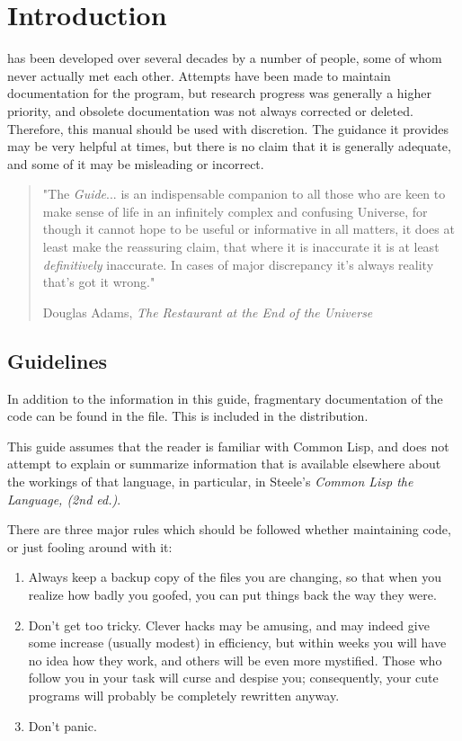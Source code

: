 \chapter{Introduction}

\TPS has been developed over several decades by a number of people,
some of whom never actually met each other. Attempts have been made
to maintain documentation for the program, but research progress was 
generally a higher priority, and obsolete documentation was not always
corrected or deleted. Therefore, this manual should be used with discretion.
The guidance it provides may be very helpful at times, but there is no
claim that it is generally adequate, and some of it may
be misleading or incorrect.

\begin{quotation}
"The {\it Guide}... is an indispensable
companion to all those who are keen to make sense of life in
an infinitely complex and confusing Universe, for though it
cannot hope to be useful or informative in all matters, it
does at least make the reassuring claim, that where it is
inaccurate it is at least {\it definitively} inaccurate. In cases
of major discrepancy it's always reality that's got it wrong."

Douglas Adams, {\it The Restaurant at the End of the Universe}
\end{quotation}

\section{Guidelines}

In addition to the information in this guide, fragmentary documentation
of the \TPS code can be found in the {\it {}} file.
This is included in the \TPS distribution.

This guide assumes that the reader is familiar with Common Lisp, and
does not attempt to explain or summarize information that is available
elsewhere about the workings of that language, in particular, in
Steele's {\it Common Lisp the Language, (2nd ed.)}.

There are three major rules which should be followed whether maintaining
\TPS code, or just fooling around with it:

\begin{enumerate}
\item Always keep a backup copy of the files you are changing, so that when
you realize how badly you goofed, you can put things back the way they were.

\item Don't get too tricky.  Clever hacks may be amusing, and may indeed
give some increase (usually modest) in efficiency, but within weeks
you will have no idea how they work, and others will be even more
mystified.  Those who follow you in your task will curse and despise
you; consequently, your cute programs will probably be completely rewritten
anyway. 

\item Don't panic.
\end{enumerate}

